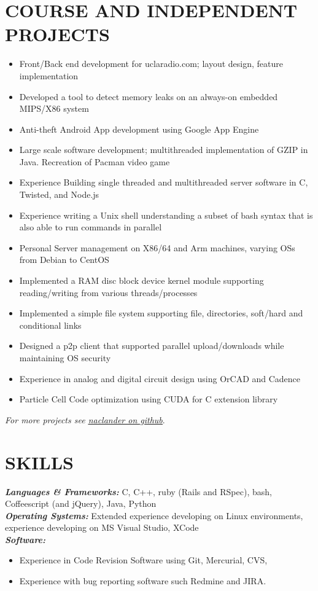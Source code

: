 \documentclass[line,letterpaper]{resume}
\begin{document}
\begin{resume}
\section{\uppercase{Course and Independent Projects}}
	\begin{itemize}
	\item Front/Back end development for uclaradio.com; layout design, feature implementation
	\item Developed a tool to detect memory leaks on an always-on embedded MIPS/X86 system
	\item Anti-theft Android App development using Google App Engine
	\item Large scale software development; multithreaded implementation of GZIP
	in Java. Recreation of Pacman video game
	\item Experience Building single threaded and multithreaded server software
	in C, Twisted, and Node.js
	\item Experience writing a Unix shell understanding a subset of bash syntax
	that is also able to run commands in parallel
	\item Personal Server management on X86/64 and Arm machines, varying OSs
	from Debian to CentOS
	\item Implemented a RAM disc block device kernel module supporting
	reading/writing from various threads/processes
	\item Implemented a simple file system supporting file, directories,
	soft/hard and conditional links
	\item Designed a p2p client that supported parallel upload/downloads
	while maintaining OS security
	\item Experience in analog and digital circuit design using OrCAD and Cadence
	\item Particle Cell Code optimization using CUDA for C extension library
	\end{itemize}
    \vspace{-6pt}

    \hfill \emph{For more projects see
    \underline{\href{https://github.com/naclander}{naclander on github}}}.

    \vspace{-15pt}

    \section{\uppercase{Skills}}
    {\sl\textbf{Languages \& Frameworks:}}\/
    C, C++, ruby (Rails and RSpec), bash, Coffeescript (and jQuery), Java, Python\\
    {\sl\textbf{Operating Systems:}}\/
	Extended experience developing on Linux environments, experience developing on
	MS Visual Studio, XCode \\
    {\sl\textbf{Software:}}\/
	\begin{itemize}
	\item Experience in Code Revision Software using Git, Mercurial, CVS,
	\item Experience with bug reporting software such Redmine and JIRA.
	\end{itemize}
    \vspace{-6pt}

\end{resume}
\end{document}
